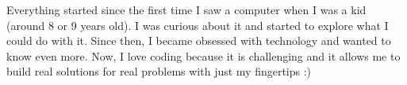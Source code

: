 
Everything started since the first time I saw a computer when I was a kid (around 8 or 9 years old). 
I was curious about it and started to explore what I could do with it. Since then, 
I became obsessed with technology and wanted to know even more.
Now, I love coding because it is challenging and it allows me to build real solutions 
for real problems with just my fingertips :)
